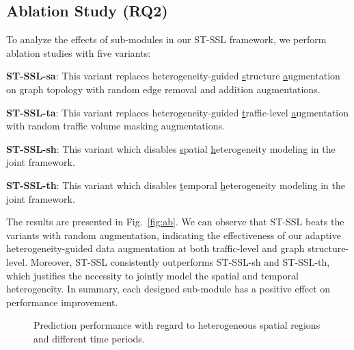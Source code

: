 \documentclass[letterpaper]{article} \usepackage{aaai23}  \usepackage{times}  \usepackage{helvet}  \usepackage{courier}  \usepackage[hyphens]{url}  \usepackage{graphicx} \urlstyle{rm} \def\UrlFont{\rm}  \usepackage{natbib}  \usepackage{caption} \frenchspacing  \setlength{\pdfpagewidth}{8.5in} \setlength{\pdfpageheight}{11in}
\newcommand{\bitem}[1]{\noindent \textbf{#1}}
\newcommand{\name}{ST-SSL\xspace}
\newcommand{\figureautorefname}{Fig.}
\begin{document}
\subsection{Ablation Study (RQ2)}

To analyze the effects of sub-modules in our \name framework, we perform ablation studies with five variants:

\bitem{\name-sa}: This variant replaces heterogeneity-guided \underline{s}tructure \underline{a}ugmentation on graph topology with random edge removal and addition augmentations. 

\bitem{\name-ta}: This variant replaces heterogeneity-guided \underline{t}raffic-level \underline{a}ugmentation with random traffic volume masking augmentations.

\bitem{\name-sh}: This variant which disables \underline{s}patial \underline{h}eterogeneity modeling in the joint framework.


\bitem{\name-th}: This variant which disables \underline{t}emporal \underline{h}eterogeneity modeling in the joint framework.


The results are presented in \figureautorefname{~\ref{fig:ab}}. We can observe that \name beats the variants with random augmentation, indicating the effectiveness of our adaptive heterogeneity-guided data augmentation at both traffic-level and graph structure-level. Moreover, \name consistently outperforms \name-sh and \name-th, which justifies the necessity to jointly model the spatial and temporal heterogeneity. In summary, each designed sub-module has a positive effect on performance improvement.

\begin{figure}[t]
    \centering
    \quad
    \quad
    \vspace{-.2cm}
    \caption{Prediction performance with regard to heterogeneous spatial regions and different time periods.}
    \vspace{-.3cm}
    \label{fig:robust}
\end{figure}
\end{document}
